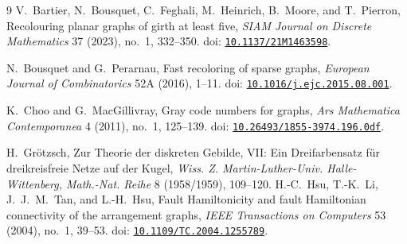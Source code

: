 \documentclass[11pt]{article}
\newcommand{\doi}[1]{doi: \href{https://doi.org/#1}{\nolinkurl{#1}}}
\theoremstyle{remark}
\numberwithin{equation}{section}
\numberwithin{table}{section}
\begin{document}
\clearpage
\begin{thebibliography}{9}
V.~Bartier, N.~Bousquet, C.~Feghali, M.~Heinrich, B.~Moore, and T.~Pierron,
\newblock Recolouring planar graphs of girth at least five,
\newblock \emph{SIAM Journal on Discrete Mathematics} 37 (2023), no.~1, 332--350.
\newblock \doi{10.1137/21M1463598}.

N.~Bousquet and G.~Perarnau,
\newblock Fast recoloring of sparse graphs,
\newblock \emph{European Journal of Combinatorics} 52A (2016), 1--11.
\newblock \doi{10.1016/j.ejc.2015.08.001}.

K.~Choo and G.~MacGillivray,
\newblock Gray code numbers for graphs,
\newblock \emph{Ars Mathematica Contemporanea} 4 (2011), no.~1, 125--139.
\newblock \doi{10.26493/1855-3974.196.0df}.

H.~Gr\"otzsch,
\newblock Zur Theorie der diskreten Gebilde, VII: Ein Dreifarbensatz f\"ur dreikreisfreie Netze auf der Kugel,
\newblock \emph{Wiss. Z. Martin-Luther-Univ. Halle-Wittenberg, Math.-Nat. Reihe} 8 (1958/1959), 109--120.
H.-C.~Hsu, T.-K.~Li, J.~J.~M.~Tan, and L.-H.~Hsu,
\newblock Fault Hamiltonicity and fault Hamiltonian connectivity of the arrangement graphs,
\newblock \emph{IEEE Transactions on Computers} 53 (2004), no.~1, 39--53.
\newblock \doi{10.1109/TC.2004.1255789}.

\end{thebibliography}
\end{document}
